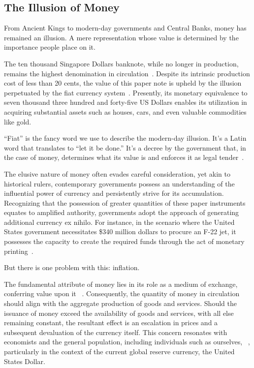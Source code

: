 \subsection{The Illusion of Money}
From Ancient Kings to modern-day governments and Central Banks, money has remained an illusion. A mere representation whose value is determined
by the importance people place on it.

The ten thousand Singapore Dollars banknote, while no longer in production, remains the highest denomination in circulation~\cite{goodhart1998}.
Despite its intrinsic production cost of less than 20 cents, the value of this paper note is upheld by the illusion perpetuated by the fiat
currency system~\cite{gupta2019}. Presently, its monetary equivalence to seven thousand three hundred and forty-five US Dollars enables its
utilization in acquiring substantial assets such as houses, cars, and even valuable commodities like gold.

“Fiat” is the fancy word we use to describe the modern-day illusion. It's a Latin word that translates to “let it be done.” It's a decree by
the government that, in the case of money, determines what its value is and enforces it as legal tender~\cite{reinhart2018, friedman2000}.

The elusive nature of money often evades careful consideration, yet akin to historical rulers, contemporary governments possess an understanding
of the influential power of currency and persistently strive for its accumulation. Recognizing that the possession of greater quantities of these
paper instruments equates to amplified authority, governments adopt the approach of generating additional currency ex nihilo. For instance, in the
scenario where the United States government necessitates \$340 million dollars to procure an F-22 jet, it possesses the capacity to create the
required funds through the act of monetary printing~\cite{graeber2011, mankiw2014}.

But there is one problem with this: inflation.

The fundamental attribute of money lies in its role as a medium of exchange, conferring value upon it ~\cite{mankiw2014}. Consequently, the
quantity of money in circulation should align with the aggregate production of goods and services. Should the issuance of money exceed the
availability of goods and services, with all else remaining constant, the resultant effect is an escalation in prices and a subsequent
devaluation of the currency itself. This concern resonates with economists and the general population, including individuals such as ourselves,
~\cite{blinder2010}, particularly in the context of the current global reserve currency, the United States Dollar.

